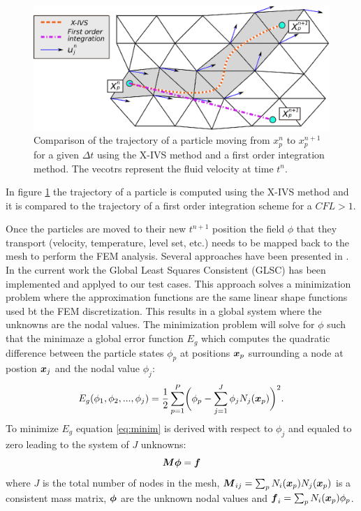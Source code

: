 \begin{figure}[htp] 
\centering 
\includegraphics[scale=.6]{./imgs/xivs.eps}
\caption{Comparison of the trajectory of a particle moving from $x_p^n$ to $x_p^{n+1}$ for a given $\Delta t$ using the X-IVS method and a first order integration method. The vecotrs represent the fluid velocity at time $t^n$.}
\label{fig:xivs}
\end{figure}

In figure \ref{fig:xivs} the trajectory of a particle is computed using the X-IVS method and it is compared to the trajectory of a first order integration scheme for a $CFL>1$. 

Once the particles are moved to their new $t^{n+1}$ position the field $\phi$ that they transport (velocity, temperature, level set, etc.) needs to be mapped back to the mesh to perform the FEM analysis. Several approaches have been presented in \cite{gimenez:tesis}. In the current work the  Global Least Squares Consistent (GLSC) has been implemented and applyed to our test cases. This approach solves a minimization problem where the approximation functions are the same linear shape functions used bt the FEM discretization. This results in a global system where the unknowns are the nodal values. The minimization problem will solve for $\phi$ such that the minimaze a global error function $E_g$ which computes the quadratic difference between the particle states $\phi_p$ at positions $\boldsymbol{x}_p$ surrounding a node at postion $\boldsymbol{x}_j$ and the nodal value $\phi_j$:
\begin{equation}\label{eq:minim}
  E_g(\phi_1,\phi_2,...,\phi_j)=\frac{1}{2}\sum_{p=1}^P \biggl(\phi_p-\sum_{j=1}^J\phi_jN_j(\boldsymbol{x}_p)\biggr)^2.
\end{equation}
To minimize $E_g$ equation \ref{eq:minim} is derived with respect to $\phi_j$ and equaled to zero leading to the system of $J$ unknowns:
\begin{equation}\label{eq:mapptom}
  \boldsymbol{M}\boldsymbol{\phi}=\boldsymbol{f}
\end{equation}
where $J$ is the total number of nodes in the mesh, $\boldsymbol{M}_{ij}=\sum_pN_i(\boldsymbol{x}_p)N_j(\boldsymbol{x}_p)$ is a consistent mass matrix, $\boldsymbol{\phi}$ are the unknown nodal values and $\boldsymbol{f}_i=\sum_pN_i(\boldsymbol{x}_p)\phi_p$.

